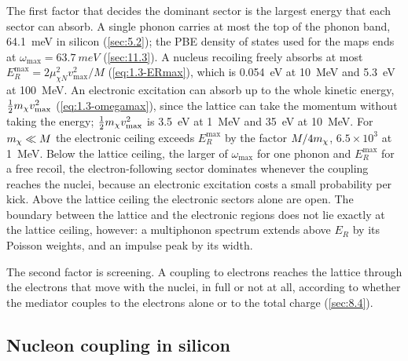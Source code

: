 The first factor that decides the dominant sector is the largest energy that each sector can absorb. A single phonon carries at most the top of the phonon band, \SI{64.1}{meV} in silicon (\cref{sec:5.2}); the PBE density of states used for the maps ends at $\omega_{\mathrm{max}} = \SI{63.7}{meV}$ (\cref{sec:11.3}). A nucleus recoiling freely absorbs at most $E_R^{\mathrm{max}} = 2\mu_{\chi N}^2v_{\mathrm{max}}^2/M$ (\cref{eq:1.3-ERmax}), which is \SI{0.054}{eV} at \SI{10}{MeV} and \SI{5.3}{eV} at \SI{100}{MeV}. An electronic excitation can absorb up to the whole kinetic energy, $\tfrac12m_{\chi} v_{\mathrm{max}}^2$ (\cref{eq:1.3-omegamax}), since the lattice can take the momentum without taking the energy; $\tfrac12m_{\chi} v_{\mathrm{max}}^2$ is \SI{3.5}{eV} at \SI{1}{MeV} and \SI{35}{eV} at \SI{10}{MeV}. For $m_{\chi} \ll M$ the electronic ceiling exceeds $E_R^{\mathrm{max}}$ by the factor $M/4m_{\chi}$, $6.5\times10^3$ at \SI{1}{MeV}. Below the lattice ceiling, the larger of $\omega_{\mathrm{max}}$ for one phonon and $E_R^{\mathrm{max}}$ for a free recoil, the electron-following sector dominates whenever the coupling reaches the nuclei, because an electronic excitation costs a small probability per kick. Above the lattice ceiling the electronic sectors alone are open. The boundary between the lattice and the electronic regions does not lie exactly at the lattice ceiling, however: a multiphonon spectrum extends above $E_R$ by its Poisson weights, and an impulse peak by its width.

The second factor is screening. A coupling to electrons reaches the lattice through the electrons that move with the nuclei, in full or not at all, according to whether the mediator couples to the electrons alone or to the total charge (\cref{sec:8.4}).

\subsection{Nucleon coupling in silicon}\label{sec:17.1-nucleon}

